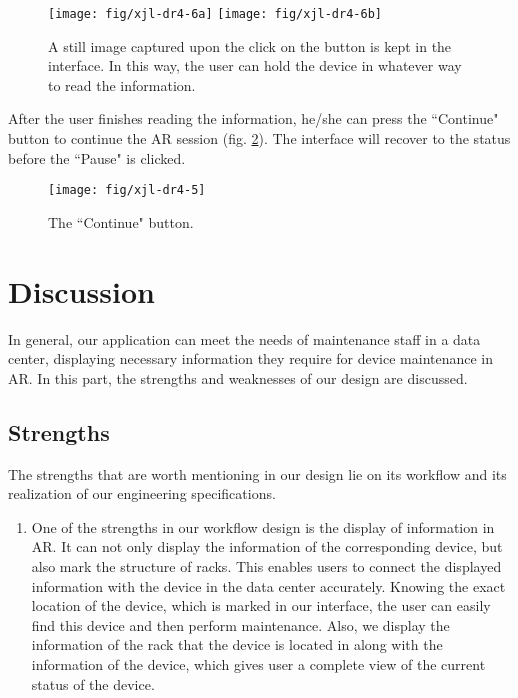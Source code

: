 \documentclass[11pt,a4paper]{article}
\begin{document}
\begin{onehalfspace}
\begin{itemize}
    \begin{figure}[H]
    \centering
    \texttt{[image: fig/xjl-dr4-6a]}
    \quad
    \texttt{[image: fig/xjl-dr4-6b]}
    \caption{A still image captured upon the click on the button is kept in the interface. In this way, the user can hold the device in whatever way to read the information.}
    \label{xjl-dr4-6}
    \end{figure}
    
    After the user finishes reading the information, he/she can press the ``Continue" button to continue the AR session (fig. \ref{xjl-dr4-5}). The interface will recover to the status before the ``Pause" is clicked.
    
    \begin{figure}[H]
    \centering
    \texttt{[image: fig/xjl-dr4-5]}
    \caption{The ``Continue" button.}
    \label{xjl-dr4-5}
    \end{figure}
    
    
\end{itemize}


\section{Discussion}

In general, our application can meet the needs of maintenance staff in a data center, displaying necessary information they require for device maintenance in AR. In this part, the strengths and weaknesses of our design are discussed.

\subsection{Strengths}

The strengths that are worth mentioning in our design lie on its workflow and its realization of our engineering specifications. 

\begin{enumerate}
    \item One of the strengths in our workflow design is the display of information in AR. It can not only display the information of the corresponding device, but also mark the structure of racks. This enables users to connect the displayed information with the device in the data center accurately. Knowing the exact location of the device, which is marked in our interface, the user can easily find this device and then perform maintenance. Also, we display the information of the rack that the device is located in along with the information of the device, which gives user a complete view of the current status of the device.           
    

\end{enumerate}
\end{onehalfspace}
\end{document}
